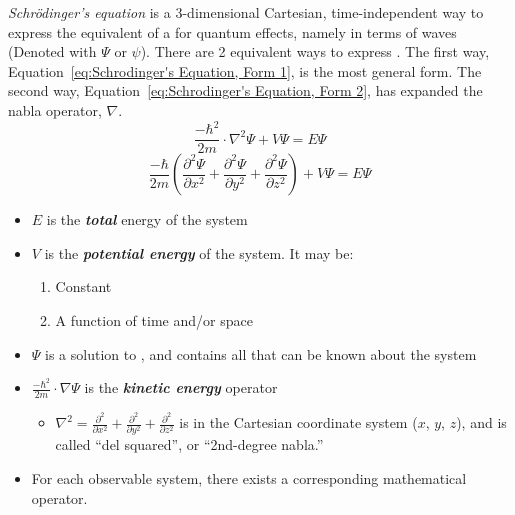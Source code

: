 		\begin{definition} \label{def:Schrodinger's Equation}
			\emph{Schr\"{o}dinger's equation} is a 3-dimensional Cartesian, time-independent way to express the equivalent of a  for quantum effects, namely in terms of waves (Denoted with $\Psi$ or $\psi$).
			There are 2 equivalent ways to express .
			The first way, Equation~\eqref{eq:Schrodinger's Equation, Form 1}, is the most general form.
			The second way, Equation~\eqref{eq:Schrodinger's Equation, Form 2}, has expanded the nabla operator, $\nabla$.
			\begin{equation} \label{eq:Schrodinger's Equation, Form 1}
				\frac{- \hbar^{2}}{2m} \cdot \nabla^{2} \Psi + V\Psi = E\Psi
			\end{equation}
			\begin{equation} \label{eq:Schrodinger's Equation, Form 2}
				\frac{-\hbar}{2m} \left( \frac{\partial^{2} \Psi}{\partial x^{2}} + \frac{\partial^{2} \Psi}{\partial y^{2}} + \frac{\partial^{2} \Psi}{\partial z^{2}} \right) + V\Psi = E\Psi
			\end{equation}
			\begin{itemize}[noitemsep, nolistsep]
				\item $E$ is the \emph{\textbf{total}} energy of the system
				\item $V$ is the \emph{\textbf{potential energy}} of the system. It may be:
				\begin{enumerate}
					\item Constant
					\item A function of time and/or space
				\end{enumerate}
				\item $\Psi$ is a solution to , and contains all that can be known about the system
				\item $\frac{-\hbar^{2}}{2m} \cdot \nabla\Psi$ is the \emph{\textbf{kinetic energy}} operator
				\begin{itemize}[noitemsep, nolistsep]
					\item $\nabla^{2} = \frac{\partial^{2}}{\partial x^{2}} + \frac{\partial^{2}}{\partial y^{2}} + \frac{\partial^{2}}{\partial z^{2}}$ is in the Cartesian coordinate system ($x$, $y$, $z$), and is called ``del squared'', or ``2nd-degree nabla.''
				\end{itemize}
				\item For each observable system, there exists a corresponding mathematical operator.

\end{itemize}
\end{definition}
